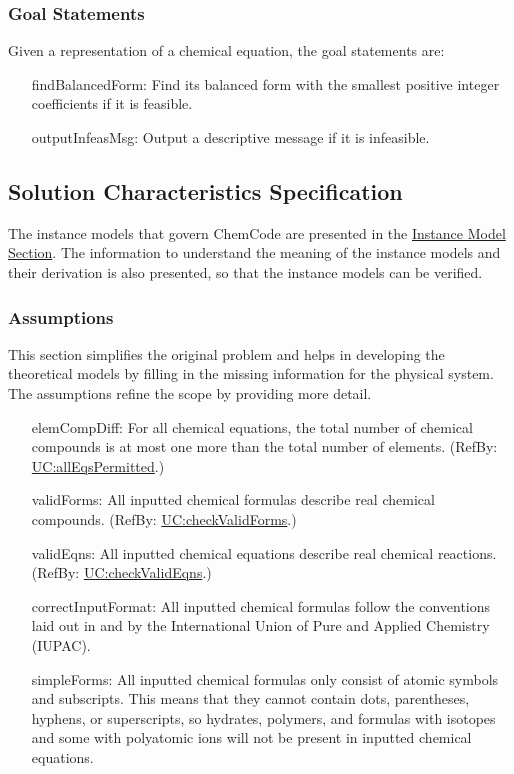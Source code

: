 \documentclass[12pt]{article}
\begin{document}
\subsubsection{Goal Statements}
\label{Sec:GoalStmt}
Given a representation of a chemical equation, the goal statements are:

\begin{itemize}
\item[findBalancedForm:\phantomsection\label{findBalancedForm}]{Find its balanced form with the smallest positive integer coefficients if it is feasible.}
\item[outputInfeasMsg:\phantomsection\label{outputInfeasMsg}]{Output a descriptive message if it is infeasible.}
\end{itemize}
\subsection{Solution Characteristics Specification}
\label{Sec:SolCharSpec}
The instance models that govern ChemCode are presented in the \hyperref[Sec:IMs]{Instance Model Section}. The information to understand the meaning of the instance models and their derivation is also presented, so that the instance models can be verified.

\subsubsection{Assumptions}
\label{Sec:Assumps}
This section simplifies the original problem and helps in developing the theoretical models by filling in the missing information for the physical system. The assumptions refine the scope by providing more detail.

\begin{itemize}
\item[elemCompDiff:\phantomsection\label{elemCompDiff}]{For all chemical equations, the total number of chemical compounds is at most one more than the total number of elements. (RefBy: \hyperref[allEqsPermitted]{UC:allEqsPermitted}.)}
\item[validForms:\phantomsection\label{validForms}]{All inputted chemical formulas describe real chemical compounds. (RefBy: \hyperref[checkValidForms]{UC:checkValidForms}.)}
\item[validEqns:\phantomsection\label{validEqns}]{All inputted chemical equations describe real chemical reactions. (RefBy: \hyperref[checkValidEqns]{UC:checkValidEqns}.)}
\item[correctInputFormat:\phantomsection\label{correctInputFormat}]{All inputted chemical formulas follow the conventions laid out in \cite{inorganicIUPAC} and \cite{organicIUPAC} by the International Union of Pure and Applied Chemistry (IUPAC).}
\item[simpleForms:\phantomsection\label{simpleForms}]{All inputted chemical formulas only consist of atomic symbols and subscripts. This means that they cannot contain dots, parentheses, hyphens, or superscripts, so hydrates, polymers, and formulas with isotopes and some with polyatomic ions will not be present in inputted chemical equations.}
\end{itemize}
\end{document}
